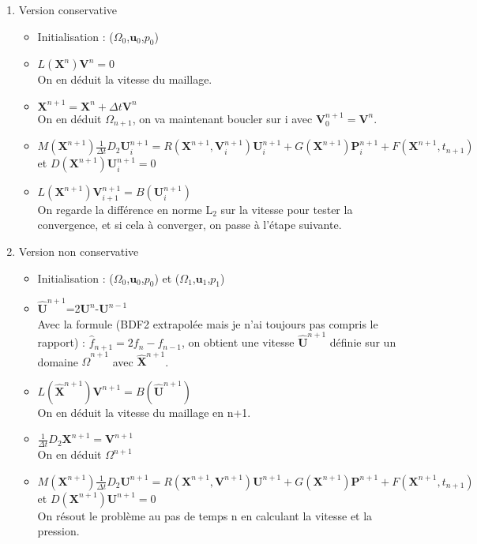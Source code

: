 \documentclass{article}
\theoremstyle{plain}
\numberwithin{equation}{section} %
\newcommand{\bu}{{\boldsymbol{u}}}
\begin{document}
\begin{enumerate}

	\item Version conservative
	\begin{itemize}
		\item Initialisation :  ($\Omega_0$,$\bu_0$,$p_0$)
		\item  $L(\mathbf{X}^{n})\mathbf{V}^{n}=0$\\
		On en d\'eduit la vitesse du maillage.
		\item $\mathbf{X}^{n+1}=\mathbf{X}^{n}+\Delta t \mathbf{V}^{n}$\\
		On en d\'eduit $\Omega_{n+1}$, on va maintenant boucler sur i avec $\mathbf{V}^{n+1}_0=\mathbf{V}^n$.
		\item  $M(\mathbf{X}^{n+1})\frac{1}{\Delta t}D_2 \mathbf{U}^{n+1}_i=R(\mathbf{X}^{n+1},\mathbf{V}^{n+1}_i)\mathbf{U}^{n+1}_i+G(\mathbf{X}^{n+1})\mathbf{P}^{n+1}_i+F(\mathbf{X}^{n+1},t_{n+1})$ et $D(\mathbf{X}^{n+1})\mathbf{U}^{n+1}_i=0$\\
		\item $L(\mathbf{X}^{n+1})\mathbf{V}^{n+1}_{i+1}=B(\mathbf{U}^{n+1}_i)$\\
		On regarde la diff\'erence en norme $\mathrm{L}_2$ sur la vitesse pour tester la convergence, et si cela \`a converger, on passe \`a l'\'etape suivante.
	\end{itemize}	
	
	\item Version non conservative
	
	\begin{itemize}
		\item Initialisation : ($\Omega_0$,$\bu_0$,$p_0$) et ($\Omega_1$,$\bu_1$,$p_1$)
		\item $\hat{\mathbf{U}}^{n+1}$=2$\mathbf{U}^{n}$-$\mathbf{U}^{n-1}$\\
		Avec la formule (BDF2 extrapol\'ee mais je n'ai toujours pas compris le rapport) : $\hat{f}_{n+1}=2f_n-f_{n-1}$, on obtient une vitesse $\hat{\mathbf{U}}^{n+1}$ d\'efinie sur un domaine $\hat{\Omega}^{n+1}$ avec $\hat{\mathbf{X}}^{n+1}$.
		\item $L(\hat{\mathbf{X}}^{n+1})\mathbf{V}^{n+1}=B(\hat{\mathbf{U}}^{n+1})$\\
		On en d\'eduit la vitesse du maillage en n+1.
		\item $\frac{1}{\Delta t}D_2 \mathbf{X}^{n+1}=\mathbf{V}^{n+1}$ \\
		On en d\'eduit $\Omega^{n+1}$
		\item $M(\mathbf{X}^{n+1})\frac{1}{\Delta t}D_2 \mathbf{U}^{n+1}=R(\mathbf{X}^{n+1},\mathbf{V}^{n+1})\mathbf{U}^{n+1}+G(\mathbf{X}^{n+1})\mathbf{P}^{n+1}+F(\mathbf{X}^{n+1},t_{n+1})$ et $D(\mathbf{X}^{n+1})\mathbf{U}^{n+1}=0$\\
		On r\'esout le probl\`eme au pas de temps n en calculant la vitesse et la pression.
	\end{itemize}

\end{enumerate}
\end{document}
